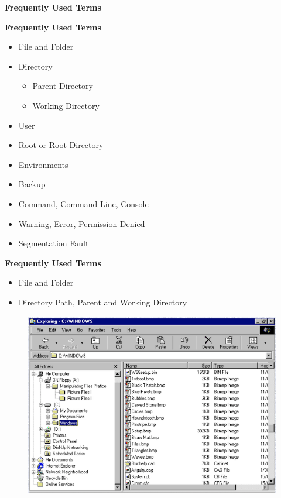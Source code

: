 \documentclass[ignorenonframetext,]{beamer}
\providecommand{\tightlist}{%
  \setlength{\itemsep}{0pt}\setlength{\parskip}{0pt}}
\begin{document}
\begin{frame}[fragile]{\textbf{Frequently Used Terms}}

\begin{block}{\textbf{Frequently Used Terms}}

\begin{itemize}
\tightlist
\item
  File and Folder
\item
  Directory

  \begin{itemize}
  \tightlist
  \item
    Parent Directory
  \item
    Working Directory
  \end{itemize}
\item
  User
\item
  Root or Root Directory
\item
  Environments
\item
  Backup
\item
  Command, Command Line, Console
\item
  Warning, Error, Permission Denied
\item
  Segmentation Fault
\end{itemize}

\end{block}

\begin{block}{\textbf{Frequently Used Terms}}

\begin{itemize}
\tightlist
\item
  File and Folder
\item
  Directory Path, Parent and Working Directory
\end{itemize}

\begin{figure}
\centering
\includegraphics{filer_folder.png}
\caption{}
\end{figure}


\end{block}
\end{frame}
\end{document}
